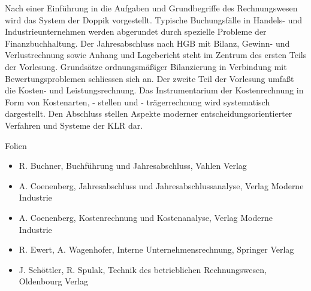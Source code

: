 \begin{course}
\begin{content}
Nach einer Einführung in die Aufgaben und Grundbegriffe des Rechnungswesen wird das System der Doppik vorgestellt. Typische Buchungsfälle in Handels- und Industrieunternehmen werden abgerundet durch spezielle Probleme der Finanzbuchhaltung. Der Jahresabschluss nach HGB mit Bilanz, Gewinn- und Verlustrechnung sowie Anhang und Lagebericht steht im Zentrum des ersten Teils der Vorlesung. Grundsätze ordnungsmäßiger Bilanzierung in Verbindung mit Bewertungsproblemen schliessen sich an. Der zweite Teil der Vorlesung umfaßt die Kosten- und Leistungsrechnung. Das Instrumentarium der Kostenrechnung in Form von Kostenarten, - stellen und - trägerrechnung wird systematisch dargestellt. Den Abschluss stellen Aspekte moderner entscheidungsorientierter Verfahren und Systeme der KLR dar.


\end{content}

\begin{media}Folien

\end{media}

\begin{literature}\begin{itemize}\item R. Buchner, Buchführung und Jahresabschluss, Vahlen Verlag  \item A. Coenenberg, Jahresabschluss und Jahresabschlussanalyse, Verlag Moderne Industrie  \item A. Coenenberg, Kostenrechnung und Kostenanalyse, Verlag Moderne Industrie  \item R. Ewert, A. Wagenhofer, Interne Unternehmensrechnung, Springer Verlag  \item J. Schöttler, R. Spulak, Technik des betrieblichen Rechnungswesen, Oldenbourg Verlag  \end{itemize}\end{literature}



\end{course}